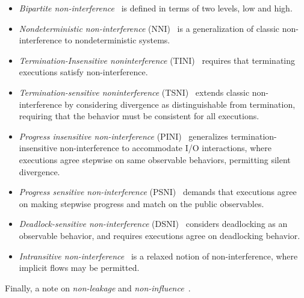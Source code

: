 \begin{itemize}

\item\emph{Bipartite non-interference}~\cite{aceto2024}
is defined in terms of two levels, low and high.

\item\emph{Nondeterministic non-interference} (NNI)~\cite{focardi1997}
is a generalization of classic non-interference to nondeterministic systems.

\item\emph{Termination-Insensitive noninterference} (TINI)~\cite{hedin2012}
requires that terminating executions satisfy non-interference.

\item\emph{Termination-sensitive noninterference} (TSNI)~\cite{hedin2012}
extends classic non-interference by considering divergence as distinguishable from termination,
requiring that the behavior must be consistent for all executions.

\item\emph{Progress insensitive non-interference} (PINI)~\cite{bay2020}
generalizes termination-insensitive non-interference to accommodate I/O interactions,
where executions agree stepwise on same observable behaviors, permitting silent divergence.

\item\emph{Progress sensitive non-interference} (PSNI)~\cite{hedin2012}
demands that executions agree on making stepwise progress and match on the public observables.

\item\emph{Deadlock-sensitive non-interference} (DSNI)~\cite{vandenheuvel2024}
considers deadlocking as an observable behavior,
and requires executions agree on deadlocking behavior.

\item\emph{Intransitive non-interference}~\cite{roscoe1999}
is a relaxed notion of non-interference, where implicit flows may be permitted.

\end{itemize}
Finally, a note on \emph{non-leakage} and \emph{non-influence}~\cite{vonoheimb2004}.
